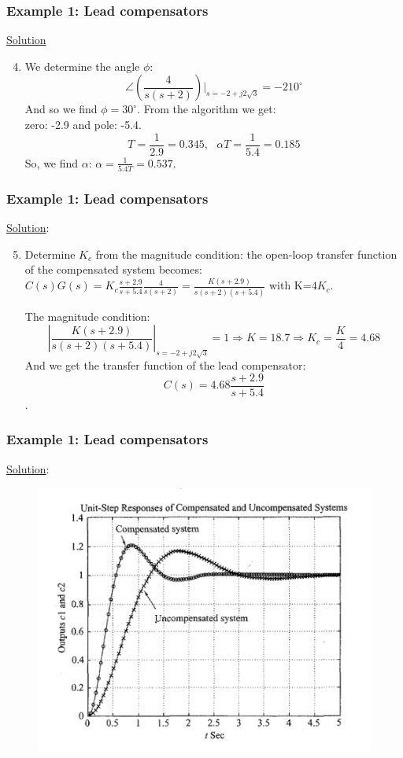 \begin{frame}
	\frametitle{Example 1: Lead compensators}
	\underline{Solution}
	\begin{enumerate}
		\setcounter{enumi}{3}
		\item We determine the angle $\phi$: $$\angle(\frac{4}{s(s+2)})|_{s=-2+j2\sqrt{3}}=-210^{\circ}$$
		And so we find $\phi=30^{\circ}$. From the algorithm we get:\\ zero: -2.9 and pole: -5.4.\\
		$$T=\frac{1}{2.9}=0.345,\text{   } \alpha T=\frac{1}{5.4}=0.185$$
		So, we find $\alpha$: $\alpha=\frac{1}{5.4T}=0.537$.
	\end{enumerate}
\end{frame}

\begin{frame}
	\frametitle{Example 1: Lead compensators}
	\underline{Solution}:
	\begin{enumerate}
		\setcounter{enumi}{4}
		\item Determine $K_c$ from the magnitude condition: the open-loop transfer function of the compensated system becomes:\\
		$C(s)G(s)=K_c\frac{s+2.9}{s+5.4}\frac{4}{s(s+2)}=\frac{K(s+2.9)}{s(s+2)(s+5.4)}$ with K=$4K_c$.\vspace{3mm}
		
		The magnitude condition:
		$$|\frac{K(s+2.9)}{s(s+2)(s+5.4)}|_{s=-2+j2\sqrt{3}}=1 \Rightarrow K=18.7 \Rightarrow K_c=\frac{K}{4}=4.68$$
		And we get the transfer function of the lead compensator:
		$$C(s)=4.68\frac{s+2.9}{s+5.4}$$.
	\end{enumerate}
\end{frame}

\begin{frame}
	\frametitle{Example 1: Lead compensators}
	\underline{Solution}:
	\begin{figure}
		\centering
		\includegraphics[width=0.7\linewidth]{Ex1_response}
	\end{figure}
\end{frame}


